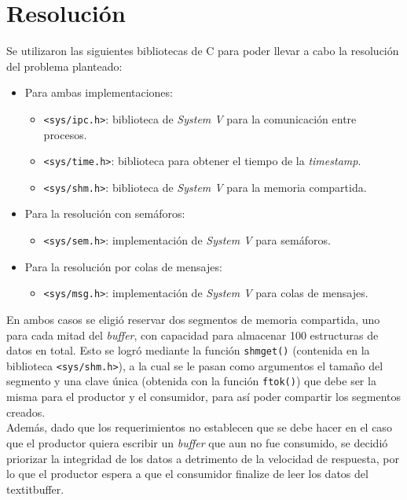 \section{Resolución}

Se utilizaron las siguientes bibliotecas de C para poder llevar a cabo la resolución del problema planteado:
\begin{itemize}
    \item Para ambas implementaciones:
    \begin{itemize}
        \item \texttt{<sys/ipc.h>}: biblioteca de \textit{System V} para la comunicación entre procesos.
        \item \texttt{<sys/time.h>}: biblioteca para obtener el tiempo de la \textit{timestamp}.
        \item \texttt{<sys/shm.h>}: biblioteca de \textit{System V} para la memoria compartida.
    \end{itemize}
    \item Para la resolución con semáforos:
    \begin{itemize}
        \item \texttt{<sys/sem.h>}: implementación de \textit{System V} para semáforos.
    \end{itemize}
    \item Para la resolución por colas de mensajes:
    \begin{itemize}
        \item \texttt{<sys/msg.h>}: implementación de \textit{System V} para colas de mensajes.\\
    \end{itemize}
\end{itemize}

En ambos casos se eligió reservar dos segmentos de memoria compartida, uno para cada mitad del \textit{buffer}, con capacidad para almacenar 100 estructuras de datos en total. Esto se logró mediante la función \texttt{shmget()} (contenida en la biblioteca \texttt{<sys/shm.h>}), a la cual se le pasan como argumentos el tamaño del segmento y una clave única (obtenida con la función \texttt{ftok()}) que debe ser la misma para el productor y el consumidor, para así poder compartir los segmentos creados.\\

Además, dado que los requerimientos no establecen que se debe hacer en el caso que el productor quiera escribir un \textit{buffer} que aun no fue consumido, se decidió priorizar la integridad de los datos a detrimento de la velocidad de respuesta, por lo que el productor espera a que el consumidor finalize de leer los datos del textit{buffer}.\\

